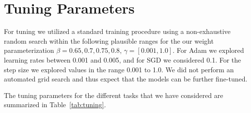 \documentclass{article} \usepackage{iclr2021_conference,times}
\begin{document}
\begin{table}[!h]
	\caption{Evaluation accuracy on PTB for word-level prediction. The * indicate results adopted from \citet{kusupati2018fastgrnn}. Note that here the parameters for the hidden-to-hidden units are reported.}
	\label{tab:PTB_word}
	\centering
\end{table}





\section{Tuning Parameters}

For tuning we utilized a standard training procedure using a non-exhaustive random search within the following plausible ranges for the our weight parameterization $\beta={0.65,0.7,0.75,0.8}$, $\gamma=[0.001, 1.0]$. For Adam we explored learning rates between 0.001 and 0.005, and for SGD we considered 0.1. For the step size we explored values in the range 0.001 to 1.0. We did not perform an automated grid search and thus expect that the models can be further fine-tuned.

The tuning parameters for the different tasks that we have considered are summarized in Table~\ref{tab:tuning}. 
\end{document}
